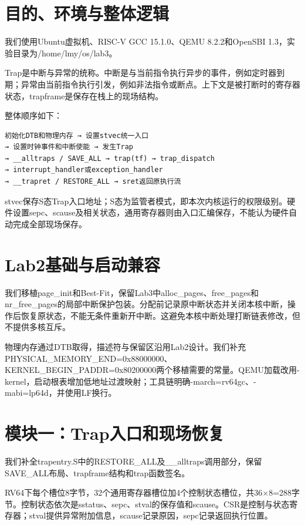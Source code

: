 \documentclass[UTF8,a4paper,10pt]{ctexart}
\begin{document}
\section{目的、环境与整体逻辑}

我们使用Ubuntu虚拟机、RISC-V GCC 15.1.0、QEMU 8.2.2和OpenSBI 1.3，实验目录为/home/lmy/os/lab3。


Trap是中断与异常的统称。中断是与当前指令执行异步的事件，例如定时器到期；异常由当前指令执行引发，例如非法指令或断点。上下文是被打断时的寄存器状态，trapframe是保存在栈上的现场结构。


整体顺序如下：


\begin{lstlisting}
初始化DTB和物理内存 → 设置stvec统一入口
→ 设置时钟事件和中断使能 → 发生Trap
→ __alltraps / SAVE_ALL → trap(tf) → trap_dispatch
→ interrupt_handler或exception_handler
→ __trapret / RESTORE_ALL → sret返回原执行流
\end{lstlisting}

stvec保存S态Trap入口地址；S态为监管者模式，即本次内核运行的权限级别。硬件设置sepc、scause及相关状态，通用寄存器则由入口汇编保存，不能认为硬件自动完成全部现场保存。


\section{Lab2基础与启动兼容}

我们移植page\_init和Best-Fit，保留Lab3中alloc\_pages、free\_pages和nr\_free\_pages的局部中断保护包装。分配前记录原中断状态并关闭本核中断，操作后恢复原状态，不能无条件重新开中断。这避免本核中断处理打断链表修改，但不提供多核互斥。


物理内存通过DTB取得，描述符与保留区沿用Lab2设计。我们补充PHYSICAL\_MEMORY\_END=0x88000000、KERNEL\_BEGIN\_PADDR=0x80200000两个移植需要的常量。QEMU加载改用-kernel，启动根表增加低地址过渡映射；工具链明确-march=rv64gc、-mabi=lp64d，并使用LF换行。


\section{模块一：Trap入口和现场恢复}

我们补全trapentry.S中的RESTORE\_ALL及\_\_alltraps调用部分，保留SAVE\_ALL布局、trapframe结构和trap函数签名。


RV64下每个槽位8字节，32个通用寄存器槽位加4个控制状态槽位，共36×8=288字节。控制状态依次是sstatus、sepc、stval的保存值和scause。CSR是控制与状态寄存器；stval提供异常附加信息，scause记录原因，sepc记录返回执行位置。
\end{document}
